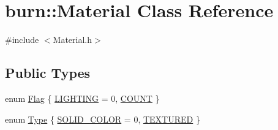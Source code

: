\hypertarget{classburn_1_1_material}{\section{burn\-:\-:Material Class Reference}
\label{classburn_1_1_material}
}


{\ttfamily \#include $<$Material.\-h$>$}

\subsection*{Public Types}
\begin{DoxyCompactItemize}
\item 
enum \hyperlink{classburn_1_1_material_a704108f8bb133e1911495b84bd0826b8}{Flag} \{ \hyperlink{classburn_1_1_material_a704108f8bb133e1911495b84bd0826b8a20ce785514749ab3909bc895127e2823}{L\-I\-G\-H\-T\-I\-N\-G} = 0, 
\hyperlink{classburn_1_1_material_a704108f8bb133e1911495b84bd0826b8a76028dd1ab583178b4e69a0894260c78}{C\-O\-U\-N\-T}
 \}
\item 
enum \hyperlink{classburn_1_1_material_a2d219315cf05e59bbffe8e3831cc6c43}{Type} \{ \hyperlink{classburn_1_1_material_a2d219315cf05e59bbffe8e3831cc6c43ae346efa71a38eb8fcbcba453a89c6aa4}{S\-O\-L\-I\-D\-\_\-\-C\-O\-L\-O\-R} = 0, 
\hyperlink{classburn_1_1_material_a2d219315cf05e59bbffe8e3831cc6c43a56549fc4dfe95a8e1fbb6bb48560f084}{T\-E\-X\-T\-U\-R\-E\-D}
 \}
\end{DoxyCompactItemize}
